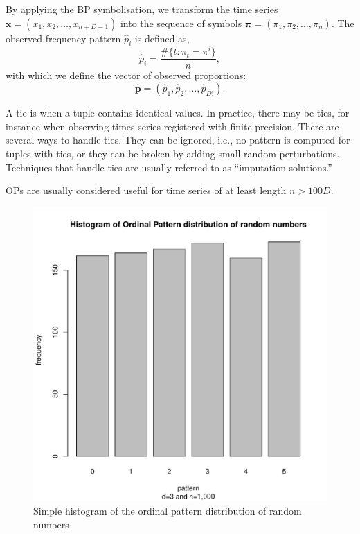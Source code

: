 By applying the BP symbolisation, we transform the time series 
$\bm x = (x_1, x_2, \dots, x_{n+D-1})$ into the sequence of symbols
$\bm \pi = (\pi_1, \pi_2,\dots, \pi_n)$.
The observed frequency pattern $\widehat{p}_i$ is defined as,
$$
\widehat{p}_i=\frac{\#\{t : \pi_t = \pi^i\}}{n} ,
$$
with which we define the vector of observed proportions:
$$
\widehat{\bm p} = (\widehat{p}_1, \widehat{p}_2, \dots, \widehat{p}_{D!}).
$$



A tie is when a tuple contains identical values. In practice, there may be ties, for instance when observing times series registered with finite precision.
There are several ways to handle ties.
They can be ignored, i.e., no pattern is computed for tuples with ties,
or they can be broken by adding small random perturbations. 
Techniques that handle ties are usually referred to as ``imputation solutions.''

OPs are usually considered useful for time series of at least length $n>100D$.

\begin{figure}
    \centering
    \includegraphics[width=\textwidth,keepaspectratio]{./powerlaw/histogram.pdf}
    \caption{Simple histogram of the ordinal pattern distribution of random numbers}
\end{figure}

